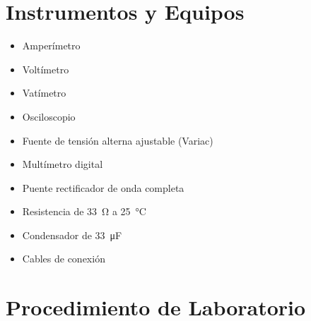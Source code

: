 \section{Instrumentos y Equipos}
\begin{itemize}
    \item Amperímetro
    \item Voltímetro
    \item Vatímetro
    \item Osciloscopio
    \item Fuente de tensión alterna ajustable (Variac)
    \item Multímetro digital
    \item Puente rectificador de onda completa
    \item Resistencia de \SI{33}{\ohm} a \SI{25}{\celsius}
    \item Condensador de \SI{33}{\micro\farad}
    \item Cables de conexión
\end{itemize}

\section{Procedimiento de Laboratorio}

